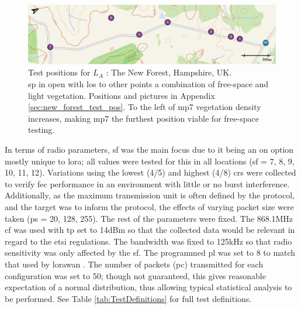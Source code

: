   \begin{figure}[H]
    \centering
    \includegraphics[width=\textwidth]{Figures/new_forest_light.pdf}
    \caption[Test Location: The New Forest, Hampshire, UK]{
    Test positions for \textbf{$L_A$} :  The New Forest, Hampshire, UK.\protect\footnotemark[1] \\
    \ac{sp} in open with \ac{los} to other points a combination of free-space and light vegetation. Positions and pictures in Appendix \ref{sec:new_forest_test_pos}. To the left of \ac{mp}7 vegetation density increases,  making \ac{mp}7 the furthest position viable for free-space testing.
    }
    \label{fig:new_forest_map}
\end{figure}

 In terms of radio parameters, \ac{sf} was the main focus due to it being an on option mostly unique to \ac{lora}; all values were tested for this in all locations (\ac{sf} = 7, 8, 9, 10, 11, 12). Variations using the lowest (4/5) and highest (4/8) \ac{cr}s were collected to verify \ac{fec} performance in an environment with little or no burst interference. Additionally, as the maximum transmission unit is often defined by the protocol, and the target was to inform the protocol, the effects of varying packet size were taken (\ac{ps} = 20, 128, 255). The rest of the parameters were fixed. The 868.1MHz \ac{cf} was used with \ac{tp} set to 14dBm so that the collected data would be relevant in regard to the \ac{etsi} regulations. The bandwidth was fixed to 125kHz so that radio sensitivity was only affected by the \ac{sf}. The programmed \ac{pl} was set to 8 to match that used by \ac{lorawan} \cite{3YP:LORAWAN_REGIONAL_PARAMS}. The number of packets (\ac{pc}) transmitted for each configuration was set to 50; though not guaranteed, this gives reasonable expectation of a normal distribution, thus allowing typical statistical analysis to be performed. See Table \ref{tab:TestDefinitions} for full test definitions.
 
